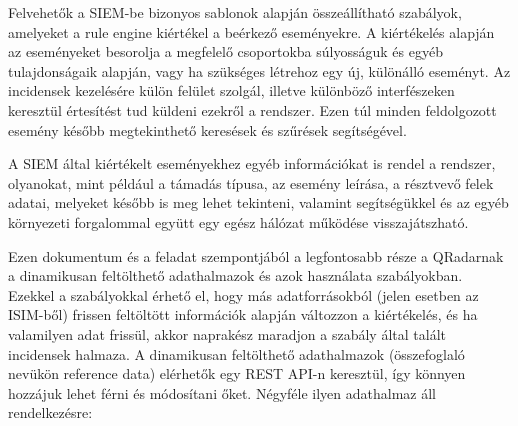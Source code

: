 Felvehetők a SIEM-be bizonyos sablonok alapján összeállítható szabályok, amelyeket a rule engine kiértékel a beérkező eseményekre. A kiértékelés alapján az eseményeket besorolja a megfelelő csoportokba súlyosságuk és egyéb tulajdonságaik alapján, vagy ha szükséges létrehoz egy új, különálló eseményt. Az incidensek kezelésére külön felület szolgál, illetve különböző interfészeken keresztül értesítést tud küldeni ezekről a rendszer. Ezen túl minden feldolgozott esemény később megtekinthető keresések és szűrések segítségével.

A SIEM által kiértékelt eseményekhez egyéb információkat is rendel a rendszer, olyanokat, mint például a támadás típusa, az esemény leírása, a résztvevő felek adatai, melyeket később is meg lehet tekinteni, valamint segítségükkel és az egyéb környezeti forgalommal együtt egy egész hálózat működése visszajátszható.
	
	
 
\label{lbl:reference_data}
Ezen dokumentum és a feladat szempontjából a legfontosabb része a QRadarnak a dinamikusan feltölthető adathalmazok és azok használata szabályokban. Ezekkel a szabályokkal érhető el, hogy más adatforrásokból (jelen esetben az ISIM-ből) frissen feltöltött információk alapján változzon a kiértékelés, és ha valamilyen adat frissül, akkor naprakész maradjon a szabály által talált incidensek halmaza. A dinamikusan feltölthető adathalmazok (összefoglaló nevükön reference data) elérhetők egy REST API-n keresztül, így könnyen hozzájuk lehet férni és módosítani őket. Négyféle ilyen adathalmaz áll rendelkezésre:

